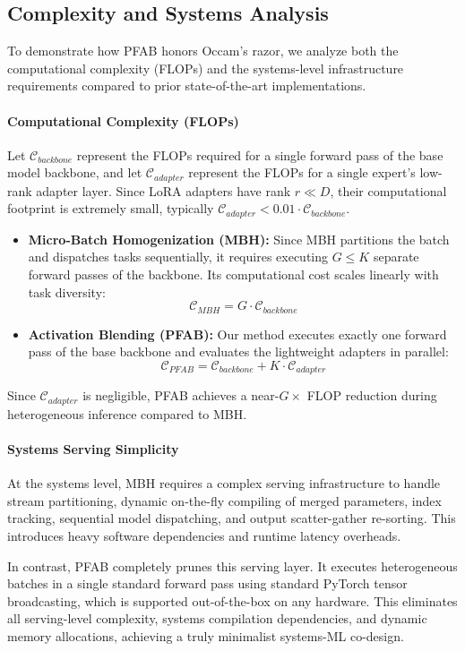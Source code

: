 \subsection{Complexity and Systems Analysis}
\label{sec:complexity}

To demonstrate how \textsc{PFAB} honors Occam's razor, we analyze both the computational complexity (FLOPs) and the systems-level infrastructure requirements compared to prior state-of-the-art implementations.

\paragraph{Computational Complexity (FLOPs)}
Let $\mathcal{C}_{backbone}$ represent the FLOPs required for a single forward pass of the base model backbone, and let $\mathcal{C}_{adapter}$ represent the FLOPs for a single expert's low-rank adapter layer. Since LoRA adapters have rank $r \ll D$, their computational footprint is extremely small, typically $\mathcal{C}_{adapter} < 0.01 \cdot \mathcal{C}_{backbone}$.
\begin{itemize}
  \item \textbf{Micro-Batch Homogenization (MBH):} Since MBH partitions the batch and dispatches tasks sequentially, it requires executing $G \le K$ separate forward passes of the backbone. Its computational cost scales linearly with task diversity:
    \begin{equation}
      \mathcal{C}_{MBH} = G \cdot \mathcal{C}_{backbone}
    \end{equation}
  \item \textbf{Activation Blending (PFAB):} Our method executes exactly one forward pass of the base backbone and evaluates the lightweight adapters in parallel:
    \begin{equation}
      \mathcal{C}_{PFAB} = \mathcal{C}_{backbone} + K \cdot \mathcal{C}_{adapter}
    \end{equation}
\end{itemize}
Since $\mathcal{C}_{adapter}$ is negligible, \textsc{PFAB} achieves a near-$G\times$ FLOP reduction during heterogeneous inference compared to MBH.

\paragraph{Systems Serving Simplicity}
At the systems level, MBH requires a complex serving infrastructure to handle stream partitioning, dynamic on-the-fly compiling of merged parameters, index tracking, sequential model dispatching, and output scatter-gather re-sorting. This introduces heavy software dependencies and runtime latency overheads. 

In contrast, \textsc{PFAB} completely prunes this serving layer. It executes heterogeneous batches in a single standard forward pass using standard PyTorch tensor broadcasting, which is supported out-of-the-box on any hardware. This eliminates all serving-level complexity, systems compilation dependencies, and dynamic memory allocations, achieving a truly minimalist systems-ML co-design.
